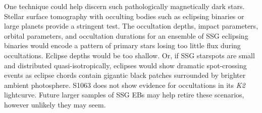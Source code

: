 \documentclass[trackchanges]{aastex631}
\begin{document}
One technique could help discern such pathologically magnetically dark stars.  Stellar surface tomography with occulting bodies such as eclipsing binaries or large planets provide a stringent test.  The occultation depths, impact parameters, orbital parameters, and occultation durations for an ensemble of SSG eclipsing binaries would encode a pattern of primary stars losing too little flux during occultations.  Eclipse depths would be too shallow.  Or, if SSG starspots are small and distributed quasi-isotropically, eclipses would show dramatic spot-crossing events as eclipse chords contain gigantic black patches surrounded by brighter ambient photosphere. S1063 does not show evidence for occultations in its \emph{K2} lightcurve.  Future larger samples of SSG EBs may help retire these scenarios, however unlikely they may seem.



\end{document}
